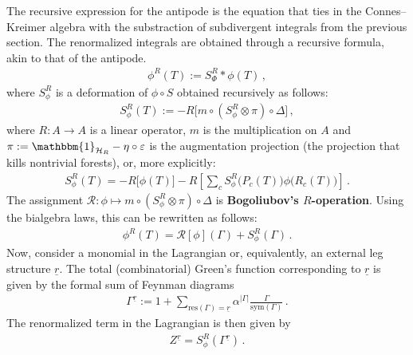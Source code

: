     The recursive expression for the antipode is the equation that ties in the Connes--Kreimer algebra with the substraction of subdivergent integrals from the previous section. The renormalized integrals are obtained through a recursive formula, akin to that of the antipode.
    \begin{gather}
        \phi^R(T) := S_\Phi^R\ast\phi(T)\,,
    \end{gather}
    where $S_\phi^R$ is a deformation of $\phi\circ S$ obtained recursively as follows:
    \begin{gather}
        S_\phi^R(T) := -R\bigl[m\circ(S_\phi^R\otimes\pi)\circ\Delta\bigr]\,,
    \end{gather}
    where $R:A\rightarrow A$ is a linear operator, $m$ is the multiplication on $A$ and $\pi:=\mathbbm{1}_{\mathcal{H}_R}-\eta\circ\varepsilon$ is the augmentation projection (the projection that kills nontrivial forests), or, more explicitly:
    \begin{gather}
        S_\phi^R(T) = -R\bigl[\phi(T)\bigr] - R\left[\sum_cS_\phi^R\bigl(P_c(T)\bigr)\phi\bigl(R_c(T)\bigr)\right]\,.
    \end{gather}
    The assignment $\mathcal{R}:\phi\mapsto m\circ(S_\phi^R\otimes\pi)\circ\Delta$ is \textbf{Bogoliubov's $R$-operation}. Using the bialgebra laws, this can be rewritten as follows:
    \begin{gather}
        \phi^R(T) = \mathcal{R}[\phi](\Gamma)+S_\phi^R(\Gamma)\,.
    \end{gather}
    Now, consider a monomial in the Lagrangian or, equivalently, an external leg structure $\underline{r}$. The total (combinatorial) Green's function corresponding to $\underline{r}$ is given by the formal sum of Feynman diagrams
    \begin{gather}
        \Gamma^{\underline{r}} := 1 + \sum_{\mathrm{res}(\Gamma)=\underline{r}}\alpha^{|\Gamma|}\frac{\Gamma}{\mathrm{sym}(\Gamma)}\,.
    \end{gather}
    The renormalized term in the Lagrangian is then given by
    \begin{gather}
        Z^{\underline{r}} = S_\phi^R(\Gamma^{\underline{r}})\,.
    \end{gather}
    
